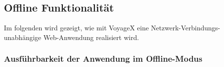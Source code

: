 \subsection{Offline Funktionalität}\label{5_OFFL}
Im folgenden wird gezeigt, wie mit VoyageX eine Netzwerk-Verbindungs-unabhängige Web-Anwendung realisiert wird.




\subsubsection{Ausführbarkeit der Anwendung im Offline-Modus}
